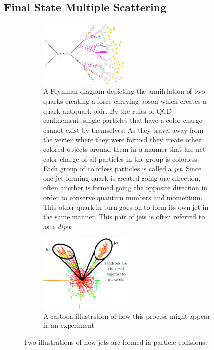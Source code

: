 \subsection{Final State Multiple Scattering}
\begin{figure}[hbtp!]
\centering
\begin{subfigure}[]{1\textwidth}\captionsetup{width=1.1\linewidth}
    \centering
    \includegraphics[width=0.5\textwidth]{Figures/jetfeynman.jpg}
\caption{A Feynman diagram\citep{jetfeynmancredit} depicting the annihilation of two quarks creating a force carrying boson which creates a quark-antiquark pair. By the rules of QCD confinement, single particles that have a color charge cannot exist by themselves. As they travel away from the vertex where they were formed they create other colored objects around them in a manner that the net color charge of all particles in the group is colorless. Each group of colorless particles is called a \textit{jet}. Since one jet forming quark is created going one direction, often another is formed going the opposite direction in order to conserve quantum numbers and momentum. This other quark in turn goes on to form its own jet in the same manner. This pair of jets is often referred to as a \textit{dijet}.}
\label{fig:jetfeynman}
\end{subfigure}
\begin{subfigure}[]{1\textwidth}
\captionsetup{width=1.5\linewidth}
    \centering
    \includegraphics[width=0.5\textwidth]{Figures/jetdiagram.jpg}
\caption{A cartoon illustration\citep{jetdiagramcredit} of how this process might appear in an experiment.}
\label{fig:jetdiagram}
\end{subfigure}
\caption[Feynman and Cartoon diagrams of Jet Formation]{Two illustrations of how jets are formed in particle collisions.}
\label{fig:jetformation}
\end{figure}
